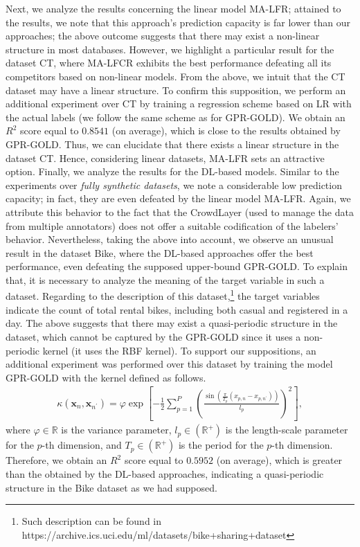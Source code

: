 \documentclass[journal]{IEEEtran}
\providecommand{\ve}[1]{{\bm{#1}}}%
\newcommand{\Real}{\mathbb{R}}
\providecommand{\ve}[1]{{\mathbf{#1}}}
\begin{document}
Next, we analyze the results concerning the linear model MA-LFR; attained to the results, we note that this approach's prediction capacity is far lower than our approaches; the above outcome suggests that there may exist a non-linear structure in most databases. However, we highlight a particular result for the dataset CT, where MA-LFCR exhibits the best performance defeating all its competitors based on non-linear models. From the above, we intuit that the CT dataset may have a linear structure. To confirm this supposition, we perform an additional experiment over CT by training a regression scheme based on LR with the actual labels (we follow the same scheme as for GPR-GOLD). We obtain an $R^2$ score equal to $0.8541$ (on average), which is close to the results obtained by GPR-GOLD. Thus, we can elucidate that there exists a linear structure in the dataset CT. Hence, considering linear datasets, MA-LFR sets an attractive option. Finally, we analyze the results for the DL-based models. Similar to the experiments over \textit{fully synthetic datasets}, we note a considerable low prediction capacity; in fact, they are even defeated by the linear model MA-LFR. Again, we attribute this behavior to the fact that the CrowdLayer (used to manage the data from multiple annotators) does not offer a suitable codification of the labelers' behavior. Nevertheless, taking the above into account, we observe an unusual result in the dataset Bike, where the DL-based approaches offer the best performance, even defeating the supposed upper-bound GPR-GOLD. To explain that, it is necessary to analyze the meaning of the target variable in such a dataset. Regarding to the description of this dataset,\footnote{Such description can be found in https://archive.ics.uci.edu/ml/datasets/bike+sharing+dataset} the target variables indicate the count of total rental bikes, including both casual and registered in a day. The above suggests that there may exist a quasi-periodic structure in the dataset, which cannot be captured by the GPR-GOLD since it uses a non-periodic kernel (it uses the RBF kernel). To support our suppositions, an additional experiment was performed over this dataset by training the model GPR-GOLD with the kernel defined as follows. 
\begin{align}\label{eq:Pkernel}
\kappa(\ve{x}_n, \ve{x}_{n^{\prime}}) = \varphi \exp \left[  - \frac{1}{2}\sum_{p=1}^{P}\left( \frac{\sin(\frac{\pi}{T_p} (x_{p,n}- x_{p,n^{\prime}}) )}{l_p}\right)^2 \right],
\end{align}
where $\varphi\in \Real$ is the variance parameter, $l_p\in (\Real^{+})$ is the length-scale parameter for the $p$-th dimension, and $T_p\in (\Real^{+})$ is the period for the $p$-th dimension. Therefore, we obtain an $R^2$ score equal to $0.5952$ (on average), which is greater than the obtained by the DL-based approaches, indicating a quasi-periodic structure in the Bike dataset as we had supposed.
\end{document}
